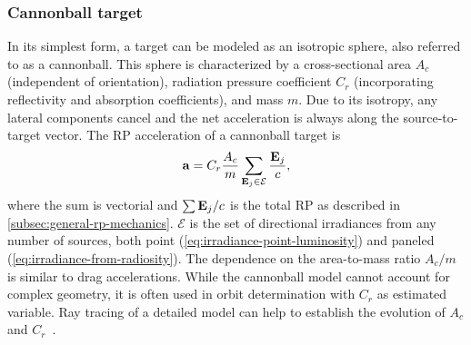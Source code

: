 \subsubsection{Cannonball target}
In its simplest form, a target can be modeled as an isotropic sphere, also referred to as a cannonball. This sphere is characterized by a cross-sectional area $A_c$ (independent of orientation), radiation pressure coefficient $C_r$ (incorporating reflectivity and absorption coefficients), and mass $m$. Due to its isotropy, any lateral components cancel and the net acceleration is always along the source-to-target vector. The \gls{RP} acceleration of a cannonball target is~\cite{Montenbruck2000}
\begin{align}
    \label{eq:cannonball-target}
    \vb a = C_r \frac{A_c}{m}\sum_{\vb E_j \in \mathcal{E}}\frac{\vb E_j}{c},
\end{align}
where the sum is vectorial and $\sum\vb E_j/c$ is the total \gls{RP} as described in \cref{subsec:general-rp-mechanics}. $\mathcal{E}$ is the set of directional irradiances from any number of sources, both point (\cref{eq:irradiance-point-luminosity}) and paneled (\cref{eq:irradiance-from-radiosity}). The dependence on the area-to-mass ratio $A_c/m$ is similar to drag accelerations. While the cannonball model cannot account for complex geometry, it is often used in orbit determination with $C_r$ as estimated variable. Ray tracing of a detailed model can help to establish the evolution of $A_c$ and $C_r$~\cite{Hattori2019}.


